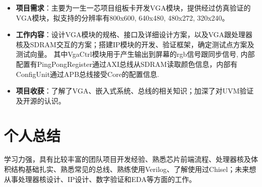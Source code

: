 \documentclass{resume}
\begin{document}
\begin{itemize}
    \item \textbf{项目需求}：主要为一生一芯项目组板卡开发VGA模块，提供经过仿真验证的VGA模块，拟支持的分辨率有800x600, 640x480, 480x272, 320x240。
    \item \textbf{工作内容}：设计VGA模块的规格、接口及详细设计方案，以及VGA跟处理器核及SDRAM交互的方案；搭建IP模块的开发、验证框架，确定测试点方案及测试向量。
    其中VgaCtrl模块用于产生输出到屏幕的rgb信号跟同步信号, 内部配置有PingPongRegister通过AXI总线从SDRAM读取颜色信息，内部有ConfigUnit通过APB总线接受Core的配置信息.
    \item \textbf{项目收获}：了解了VGA、嵌入式系统、总线的相关知识；加深了对UVM验证及开源的认识。
\end{itemize}

\section{个人总结}
学习力强，具有比较丰富的团队项目开发经验、熟悉芯片前端流程、处理器核及体积结构基础扎实、熟悉常见的总线、熟练使用Verilog、了解使用过Chisel；未来想从事处理器核设计、IP设计、数字验证和EDA等方面的工作。
\end{document}
